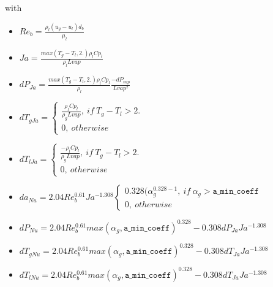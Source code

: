 with
\begin{itemize}
    \item[\small \textcolor{blue}{\ding{109}}]$Re_b = \frac{\rho_l (u_g-u_l)d_b}{\mu_l}$
    \item[\small \textcolor{blue}{\ding{109}}]$Ja=\frac{max(T_g-T_l,2.)\rho_l Cp_l}{\rho_lLvap}$
    \item[\small \textcolor{blue}{\ding{109}}]$dP_{Ja}=\frac{max(T_g-T_l,2.)\rho_l Cp_l}{\rho_l}\frac{-dP_{vap}}{Lvap^2}$
    \item[\small \textcolor{blue}{\ding{109}}]$dT_{gJa}=\begin{cases}\frac{\rho_lCp_l}{\rho_gLvap},\ if\ T_g-T_l> 2.\\ 0,\ otherwise
    \end{cases}$
    \item[\small \textcolor{blue}{\ding{109}}]$dT_{lJa}=\begin{cases}\frac{-\rho_lCp_l}{\rho_gLvap},\ if\ T_g-T_l> 2.\\ 0,\ otherwise\end{cases}$
    \item[\small \textcolor{blue}{\ding{109}}]$da_{Nu}  = 2.04 Re_b^{0.61}Ja^{-1.308}\begin{cases} 0.328(\alpha_g^{0.328-1},\ if\ \alpha_g > \texttt{a\_min\_coeff}\\ 0,\ otherwise  \end{cases}$
    \item[\small \textcolor{blue}{\ding{109}}]$dP_{Nu}  = 2.04Re_b^{0.61} max(\alpha_g, \texttt{a\_min\_coeff})^{0.328} -0.308dP_{Ja} Ja^{-1.308}$
    \item[\small \textcolor{blue}{\ding{109}}]$dT_{gNu}=2.04Re_b^{0.61} max(\alpha_g, \texttt{a\_min\_coeff})^{0.328} -0.308dT_{Ja} Ja^{-1.308}$
    \item[\small \textcolor{blue}{\ding{109}}]$dT_{lNu}=2.04Re_b^{0.61} max(\alpha_g, \texttt{a\_min\_coeff})^{0.328} -0.308dT_{Ja} Ja^{-1.308}$
\end{itemize}


